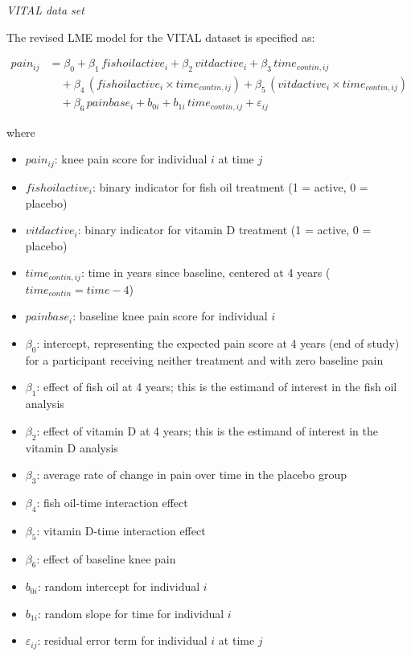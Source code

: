 \documentclass{article}
\providecommand{\tightlist}{%
  \setlength{\itemsep}{0pt}\setlength{\parskip}{0pt}}
\begin{document}
\emph{VITAL data set}

The revised LME model for the VITAL dataset is specified as:

\begin{align*}
pain_{ij} &= \beta_0 + \beta_1\, fishoilactive_i + \beta_2\, vitdactive_i + \beta_3\, time_{contin,ij} \\
&\quad + \beta_4\, (fishoilactive_i \times time_{contin,ij}) + \beta_5\, (vitdactive_i \times time_{contin,ij}) \\
&\quad + \beta_6\, painbase_i + b_{0i} + b_{1i}\, time_{contin,ij} + \varepsilon_{ij}
\end{align*}

where

\begin{itemize}
\tightlist
\item
  \(pain_{ij}\): knee pain score for individual \(i\) at time \(j\)
\item
  \(fishoilactive_i\): binary indicator for fish oil treatment (1 =
  active, 0 = placebo)
\item
  \(vitdactive_i\): binary indicator for vitamin D treatment (1 =
  active, 0 = placebo)
\item
  \(time_{contin,ij}\): time in years since baseline, centered at 4
  years (\(time_{contin} = time - 4\))
\item
  \(painbase_i\): baseline knee pain score for individual \(i\)
\item
  \(\beta_0\): intercept, representing the expected pain score at 4
  years (end of study) for a participant receiving neither treatment and
  with zero baseline pain
\item
  \(\beta_1\): effect of fish oil at 4 years; this is the estimand of
  interest in the fish oil analysis
\item
  \(\beta_2\): effect of vitamin D at 4 years; this is the estimand of
  interest in the vitamin D analysis
\item
  \(\beta_3\): average rate of change in pain over time in the placebo
  group
\item
  \(\beta_4\): fish oil-time interaction effect
\item
  \(\beta_5\): vitamin D-time interaction effect
\item
  \(\beta_6\): effect of baseline knee pain
\item
  \(b_{0i}\): random intercept for individual \(i\)
\item
  \(b_{1i}\): random slope for time for individual \(i\)
\item
  \(\varepsilon_{ij}\): residual error term for individual \(i\) at time
  \(j\)
\end{itemize}
\end{document}
